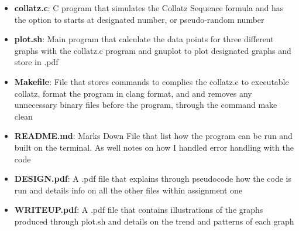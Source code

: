 \documentclass[11pt]{article} %
\begin{document}
\begin{itemize}
  \item \textbf{collatz.c}: C program that simulates the Collatz Sequence formula and has the option to starts at designated number, or pseudo-random number  
  \item \textbf{plot.sh}: Main program that calculate the data points for three different graphs with the collatz.c program and gnuplot to plot designated graphs and store in .pdf
  \item \textbf{Makefile}: File that stores commands to complies the collatz.c to executable collatz, format the program in clang format, and and removes any unnecessary binary files before the program, through the command make clean
  \item \textbf{README.md}: Marks Down File that list how the program can be run and built on the terminal. As well notes on how I handled error handling with the code
  \item \textbf{DESIGN.pdf}: A .pdf file that explains through pseudocode how the code is run and details info on all the other files within assignment one 
  \item \textbf{WRITEUP.pdf}: A .pdf file that contains illustrations of the graphs produced through plot.sh and details on the trend and patterns of each graph  
\end{itemize}

\pagebreak
\end{document}
